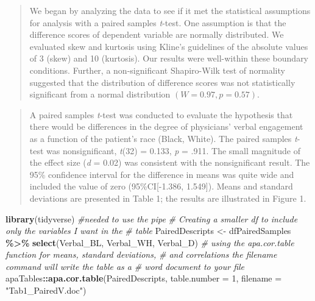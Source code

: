 \documentclass[
  11pt,
]{book}
\newenvironment{Shaded}{\begin{snugshade}}{\end{snugshade}}
\newcommand{\AttributeTok}[1]{\textcolor[rgb]{0.27,0.27,0.27}{#1}}
\newcommand{\CommentTok}[1]{\textcolor[rgb]{0.37,0.37,0.37}{\textit{#1}}}
\newcommand{\DecValTok}[1]{\textcolor[rgb]{0.06,0.06,0.06}{#1}}
\newcommand{\FunctionTok}[1]{\textcolor[rgb]{0.27,0.27,0.27}{\textbf{#1}}}
\newcommand{\NormalTok}[1]{#1}
\newcommand{\OtherTok}[1]{\textcolor[rgb]{0.37,0.37,0.37}{#1}}
\newcommand{\SpecialCharTok}[1]{\textcolor[rgb]{0.43,0.43,0.43}{\textbf{#1}}}
\newcommand{\StringTok}[1]{\textcolor[rgb]{0.5,0.5,0.5}{#1}}
\begin{document}
\begin{quote}
We began by analyzing the data to see if it met the statistical assumptions for analysis with a paired samples \emph{t}-test. One assumption is that the difference scores of dependent variable are normally distributed. We evaluated skew and kurtosis using Kline's \citeyearpar{kline_data_2016} guidelines of the absolute values of 3 (skew) and 10 (kurtosis). Our results were well-within these boundary conditions. Further, a non-significant Shapiro-Wilk test of normality suggested that the distribution of difference scores was not statistically significant from a normal distribution \((W = 0.97, p = 0.57)\).
\end{quote}

\begin{quote}
A paired samples \emph{t}-test was conducted to evaluate the hypothesis that there would be differences in the degree of physicians' verbal engagement as a function of the patient's race (Black, White). The paired samples \emph{t}-test was nonsignificant, \emph{t}(32) = 0.133, \emph{p} = .911. The small magnitude of the effect size (\emph{d} = 0.02) was consistent with the nonsignificant result. The 95\% confidence interval for the difference in means was quite wide and included the value of zero (95\%CI{[}-1.386, 1.549{]}). Means and standard deviations are presented in Table 1; the results are illustrated in Figure 1.
\end{quote}

\begin{Shaded}
\begin{Highlighting}[]
\FunctionTok{library}\NormalTok{(tidyverse)  }\CommentTok{\#needed to use the pipe }
\CommentTok{\# Creating a smaller df to include only the variables I want in the}
\CommentTok{\# table}
\NormalTok{PairedDescripts }\OtherTok{\textless{}{-}}\NormalTok{ dfPairedSamples }\SpecialCharTok{\%\textgreater{}\%}
    \FunctionTok{select}\NormalTok{(Verbal\_BL, Verbal\_WH, Verbal\_D)}
\CommentTok{\# using the apa.cor.table function for means, standard deviations,}
\CommentTok{\# and correlations the filename command will write the table as a}
\CommentTok{\# word document to your file}
\NormalTok{apaTables}\SpecialCharTok{::}\FunctionTok{apa.cor.table}\NormalTok{(PairedDescripts, }\AttributeTok{table.number =} \DecValTok{1}\NormalTok{, }\AttributeTok{filename =} \StringTok{"Tab1\_PairedV.doc"}\NormalTok{)}
\end{Highlighting}
\end{Shaded}
\end{document}
